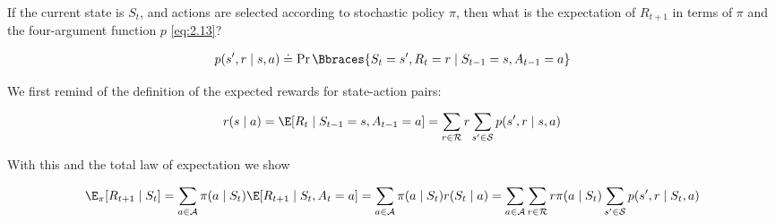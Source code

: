 \begin{exercise}
If the current state is $S_t$, and actions are selected according to stochastic policy $\pi$, then what is the expectation of $R_{t+1}$ in terms of $\pi$ and the four-argument function $p$ \eqref{eq:2.13}?

\begin{align} \label{eq:2.13}
    p(s^\prime, r \mid s, a)
    \doteq
    \Pr \Bbraces{S_t = s^\prime, R_t = r \mid S_{t-1} = s, A_{t-1} = a}
\end{align}
\end{exercise}

\begin{solution}
  We first remind of the definition of the expected rewards for state-action pairs:

\begin{align*}
  r(s\mid a)
  =
  \E[R_t \mid S_{t-1} = s, A_{t-1} = a]
  =
  \sum_{r \in \mathcal{R}} r \sum_{s^\prime \in \mathcal{S}} p(s^\prime, r \mid s, a)
\end{align*}

With this and the total law of expectation we show

\begin{align*}
  \E_\pi[R_{t+1} \mid S_t]
  =
  \sum_{a \in \mathcal{A}} \pi(a\mid S_t) \E[R_{t+1} \mid S_t, A_t = a]
  =
  \sum_{a \in \mathcal{A}} \pi(a \mid S_t) r(S_t \mid a)
  =
  \sum_{a \in \mathcal{A}}\sum_{r \in \mathcal{R}} r \pi(a \mid S_t) \sum_{s^\prime \in \mathcal{S}} p(s^\prime, r \mid S_t, a)
\end{align*}

\end{solution}
